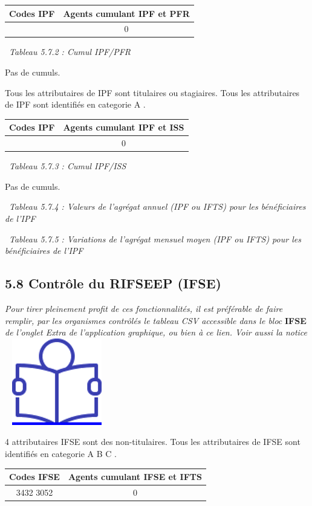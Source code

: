\begin{longtable}[]{@{}cc@{}}
\toprule
Codes IPF & Agents cumulant IPF et PFR\tabularnewline
\midrule
\endhead
& 0\tabularnewline
\bottomrule
\end{longtable}

~\emph{Tableau 5.7.2 : Cumul IPF/PFR}

Pas de cumuls.

Tous les attributaires de IPF sont titulaires ou stagiaires. Tous les
attributaires de IPF sont identifiés en categorie A .

\begin{longtable}[]{@{}cc@{}}
\toprule
Codes IPF & Agents cumulant IPF et ISS\tabularnewline
\midrule
\endhead
& 0\tabularnewline
\bottomrule
\end{longtable}

~\emph{Tableau 5.7.3 : Cumul IPF/ISS}

Pas de cumuls.

~\emph{Tableau 5.7.4 : Valeurs de l'agrégat annuel (IPF ou IFTS) pour
les bénéficiaires de l'IPF}

~\emph{Tableau 5.7.5 : Variations de l'agrégat mensuel moyen (IPF ou
IFTS) pour les bénéficiaires de l'IPF}

\hypertarget{controle-du-rifseep-ifse}{%
\subsection{5.8 Contrôle du RIFSEEP
(IFSE)}\label{controle-du-rifseep-ifse}}

\emph{Pour tirer pleinement profit de ces fonctionnalités, il est
préférable de faire remplir, par les organismes contrôlés le tableau CSV
accessible dans le bloc} \textbf{IFSE} \emph{de l'onglet Extra de
l'application graphique, ou bien à ce lien. Voir aussi la notice} ~
\href{../Docs/Notices/fiche_tableau_ifse.odt}{\includegraphics{icones/Notice.png}}

4 attributaires IFSE sont des non-titulaires. Tous les attributaires de
IFSE sont identifiés en categorie A B C .

\begin{longtable}[]{@{}cc@{}}
\toprule
Codes IFSE & Agents cumulant IFSE et IFTS\tabularnewline
\midrule
\endhead
3432 3052 & 0\tabularnewline
\bottomrule
\end{longtable}

